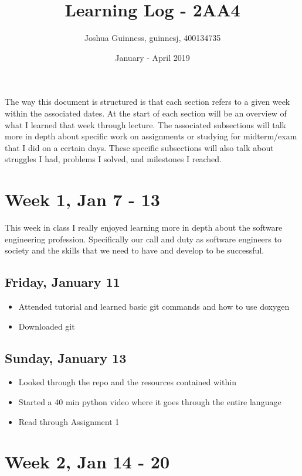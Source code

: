 \documentclass{article}
\title{Learning Log - 2AA4}
\author{Joshua Guinness, guinnesj, 400134735}
\date{January - April 2019}
\begin{document}
\maketitle

The way this document is structured is that each section refers to a given week within the associated dates. At the start of each section will be an overview of what I learned that week through lecture. The associated subsections will talk more in depth about specific work on assignments or studying for midterm/exam that I did on a certain days. These specific subsections will also talk about struggles I had, problems I solved, and milestones I reached.

\section{Week 1, Jan 7 - 13}

This week in class I really enjoyed learning more in depth about the software engineering profession. Specifically our call and duty as software engineers to society and the skills that we need to have and develop to be successful. 

\subsection{Friday, January 11}
\begin{itemize}
    \item Attended tutorial and learned basic git commands and how to use doxygen
    \item Downloaded git
\end{itemize}

\subsection{Sunday, January 13}
\begin{itemize}
    \item Looked through the repo and the resources contained within
    \item Started a 40 min python video where it goes through the entire language
    \item Read through Assignment 1
\end{itemize}

\section{Week 2, Jan 14 - 20}
\end{document}
